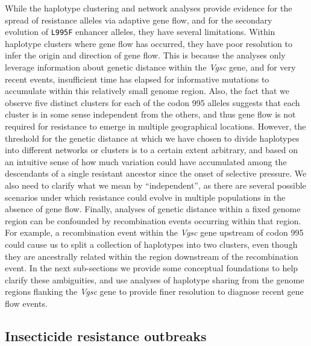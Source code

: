 \documentclass[a4paper,11pt,abstracton,hidelinks]{scrartcl}
\begin{document}
%
While the haplotype clustering and network analyses provide evidence for the spread of resistance alleles via adaptive gene flow, and for the secondary evolution of \texttt{L995F} enhancer alleles, they have several limitations.
%
Within haplotype clusters where gene flow has occurred, they have poor resolution to infer the origin and direction of gene flow.
%
This is because the analyses only leverage information about genetic distance within the \textit{Vgsc} gene, and for very recent events, insufficient time has elapsed for informative mutations to accumulate within this relatively small genome region.
%
Also, the fact that we observe five distinct clusters for each of the codon 995 alleles suggests that each cluster is in some sense independent from the others, and thus gene flow is not required for resistance to emerge in multiple geographical locations.
%
However, the threshold for the genetic distance at which we have chosen to divide haplotypes into different networks or clusters is to a certain extent arbitrary, and based on an intuitive sense of how much variation could have accumulated among the descendants of a single resistant ancestor since the onset of selective pressure.
%
We also need to clarify what we mean by ``independent'', as there are several possible scenarios under which resistance could evolve in multiple populations in the absence of gene flow.
%
Finally, analyses of genetic distance within a fixed genome region can be confounded by recombination events occurring within that region.
%
For example, a recombination event within the \textit{Vgsc} gene upstream of codon 995 could cause us to split a collection of haplotypes into two clusters, even though they are ancestrally related within the region downstream of the recombination event.
%
In the next sub-sections we provide some conceptual foundations to help clarify these ambiguities, and use analyses of haplotype sharing from the genome regions flanking the \textit{Vgsc} gene to provide finer resolution to diagnose recent gene flow events.


\subsection*{Insecticide resistance outbreaks}
\end{document}

